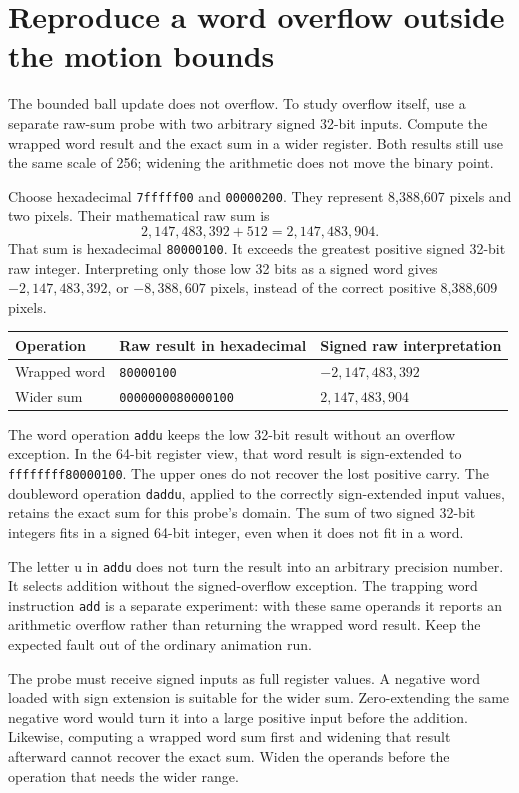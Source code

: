 \section{Reproduce a word overflow outside the motion bounds}
The bounded ball update does not overflow. To study overflow itself, use a separate
raw-sum probe with two arbitrary signed 32-bit inputs. Compute the wrapped word
result and the exact sum in a wider register. Both results still use the same
scale of 256; widening the arithmetic does not move the binary point.

Choose hexadecimal \texttt{7fffff00} and \texttt{00000200}. They represent
8,388,607 pixels and two pixels. Their mathematical raw sum is
\[
  2{,}147{,}483{,}392+512=2{,}147{,}483{,}904.
\]
That sum is hexadecimal \texttt{80000100}. It exceeds the greatest positive
signed 32-bit raw integer. Interpreting only those low 32 bits as a signed word
gives \(-2{,}147{,}483{,}392\), or \(-8{,}388{,}607\) pixels, instead of the
correct positive 8,388,609 pixels.

\begin{longtable}{lll}
  \toprule
  Operation    & Raw result in hexadecimal & Signed raw interpretation \\
  \midrule
  Wrapped word & \texttt{80000100}         & \(-2{,}147{,}483{,}392\)  \\
  Wider sum    & \texttt{0000000080000100} & \(2{,}147{,}483{,}904\)   \\
  \bottomrule
\end{longtable}
The word operation \texttt{addu} keeps the low 32-bit result without an overflow
exception. In the 64-bit register view, that word result is sign-extended to
\texttt{ffffffff80000100}. The upper ones do not recover the lost positive carry.
The doubleword operation \texttt{daddu}, applied to the correctly sign-extended
input values, retains the exact sum for this probe's domain. The sum of two signed
32-bit integers fits in a signed 64-bit integer, even when it does not fit in a word.

The letter u in \texttt{addu} does not turn the result into an arbitrary
precision number. It selects addition without the signed-overflow exception.
The trapping word instruction \texttt{add} is a separate experiment: with these
same operands it reports an arithmetic overflow rather than returning the wrapped
word result. Keep the expected fault out of the ordinary animation run.

The probe must receive signed inputs as full register values. A negative word
loaded with sign extension is suitable for the wider sum. Zero-extending the same
negative word would turn it into a large positive input before the addition.
Likewise, computing a wrapped word sum first and widening that result afterward
cannot recover the exact sum. Widen the operands before the operation that needs
the wider range.

